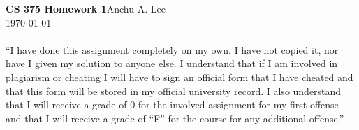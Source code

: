\documentclass{article}
\begin{document}
    \noindent\textbf{CS 375 Homework 1}\hfill Anchu A. Lee\\
    \noindent\today
    \\\\“I have done this assignment completely on my own. I have not copied it, nor have I given my solution to anyone else. I understand that if I am involved in plagiarism or cheating I will have to sign an official form that I have cheated and that this form will be stored in my official university record. I also understand that I will receive a grade of 0 for the involved assignment for my first offense and that I will receive a grade of “F” for the course for any additional offense.” 
    \\\\
\end{document}
